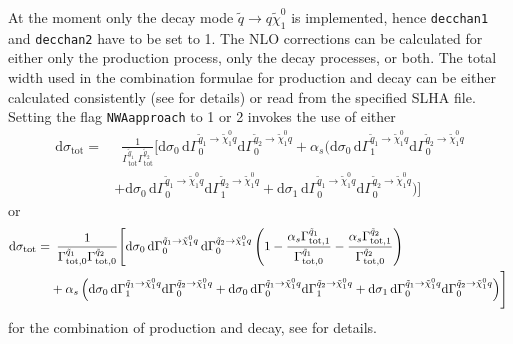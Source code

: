 \documentclass[a4paper,11pt]{article}
\newcommand{\sq}{\tilde{q}}
\newcommand{\neutone}{\tilde{\chi}^0_1}
\newcommand{\eqsp}[2]{\begin{equation}\begin{align}#1\end{align}\label{#2}\end{equation}}
\newcommand{\dGa}{\text{d}\Gamma^{\sq_1 \rightarrow \neutone q}}
\newcommand{\dGb}{\text{d}\Gamma^{\sq_2 \rightarrow \neutone q}}
\newcommand{\Ga}{\Gamma_{\text{tot}}^{\sq_1}}
\newcommand{\Gb}{\Gamma_{\text{tot}}^{\sq_2}}
\newcommand{\GaLO}{\Gamma_{\text{tot},0}^{\sq_1}}
\newcommand{\GaNLO}{\Gamma_{\text{tot},1}^{\sq_1}}
\newcommand{\GbLO}{\Gamma_{\text{tot},0}^{\sq_2}}
\newcommand{\GbNLO}{\Gamma_{\text{tot},1}^{\sq_2}}
\newcommand{\ds}{\text{d}\sigma}
\newcommand{\as}{\alpha_s}
\begin{document}
At the moment only the decay mode $\tilde{q}\rightarrow q \tilde{\chi}^0_1$ is implemented, hence {\tt decchan1} and {\tt decchan2} have to be set to 1. The NLO corrections can be calculated for either only the production process, only the decay processes, or both. The total width used in the combination formulae for production and decay can be either calculated consistently (see \cite{owndiss} for details) or read from the specified SLHA file. Setting the flag {\tt NWAapproach} to 1 or 2 invokes the use of either
 \eqsp{
 \ds_{\text{tot}} = &\,\,\,\frac{1}{\Ga \Gb} \Biggl[\ds_0 \,\dGa_0 \dGb_0   + \as \bigl( \ds_0\, \dGa_1 \dGb_0 \\&+ \ds_0\, \dGa_0 \dGb_1 + \ds_1\, \dGa_0 \dGb_0  \bigr)\Biggr]}{eq:proddec2}
or
 \begin{align}
 \label{eq:proddec1}
 \ds_{\text{tot}} =& \,\,\,\frac{1}{\GaLO \GbLO} \Biggl[\ds_0\, \dGa_0 \,\dGb_0  \left(1-\frac{\as \GaNLO }{\GaLO }-\frac{\as \GbNLO }{\GbLO }\right) \\
 &+ \as \left( \ds_0\, \dGa_1 \dGb_0 + \ds_0\, \dGa_0 \dGb_1 + \ds_1\, \dGa_0 \dGb_0  \right)\Biggr]\, \notag
 \end{align}
for the combination of production and decay, see \cite{owndiss} for details.
\end{document}
